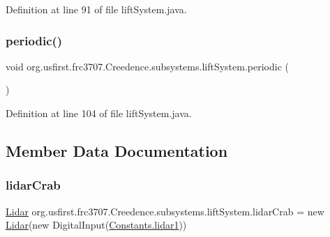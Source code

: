 Definition at line 91 of file lift\+System.\+java.

\mbox{\label{classorg_1_1usfirst_1_1frc3707_1_1_creedence_1_1subsystems_1_1lift_system_a9ddfb0eddd29188fda5a8852a20d7d5f}} 
\subsubsection{\texorpdfstring{periodic()}{periodic()}}
{\footnotesize\ttfamily void org.\+usfirst.\+frc3707.\+Creedence.\+subsystems.\+lift\+System.\+periodic (\begin{DoxyParamCaption}{ }\end{DoxyParamCaption})}



Definition at line 104 of file lift\+System.\+java.



\subsection{Member Data Documentation}
\mbox{\label{classorg_1_1usfirst_1_1frc3707_1_1_creedence_1_1subsystems_1_1lift_system_ad9918d856041f6f3e540546f8b828293}} 
\subsubsection{\texorpdfstring{lidarCrab}{lidarCrab}}
{\footnotesize\ttfamily \mbox{\hyperlink{classorg_1_1usfirst_1_1frc3707_1_1_creedence_1_1lidar_1_1_lidar}{Lidar}} org.\+usfirst.\+frc3707.\+Creedence.\+subsystems.\+lift\+System.\+lidar\+Crab = new \mbox{\hyperlink{classorg_1_1usfirst_1_1frc3707_1_1_creedence_1_1lidar_1_1_lidar}{Lidar}}(new Digital\+Input(\mbox{\hyperlink{classorg_1_1usfirst_1_1frc3707_1_1_creedence_1_1_p_i_d_ints_1_1_constants_aea549567cdd9492736429691316d0c18}{Constants.\+lidar1}}))}



